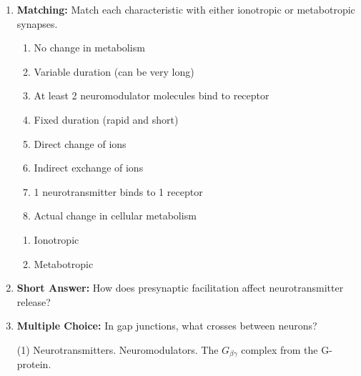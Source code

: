 \begin{enumerate}[label=\textbf{Q2.5.\arabic*}]
      \item \textbf{Matching:} Match each characteristic with either ionotropic or metabotropic synapses.
            \begin{wordbox}
                  \begin{enumerate}[label=(\alph*)]
                        \item No change in metabolism
                        \item Variable duration (can be very long)
                        \item At least 2 neuromodulator molecules bind to receptor
                        \item Fixed duration (rapid and short)
                        \item Direct change of ions
                        \item Indirect exchange of ions
                        \item 1 neurotransmitter binds to 1 receptor
                        \item Actual change in cellular metabolism
                  \end{enumerate}
            \end{wordbox}
            \begin{enumerate}[label=(\arabic*)]
                  \item Ionotropic \quad \dotfill \quad {} \\ 
                  \item Metabotropic \quad \dotfill \quad {}
            \end{enumerate}
                        
      \item \textbf{Short Answer:} How does presynaptic facilitation affect neurotransmitter release? \\
            
      \item \textbf{Multiple Choice:} In gap junctions, what crosses between neurons?
            \begin{tasks}[label=\textcolor{draculafg}{(\Alph*)}, item-format=\color{draculafg}, label-width=1.5em, item-indent=1.7em](1)
                  \task Neurotransmitters.
                  \task {}
                  \task Neuromodulators.
                  \task The \(G_{\beta\gamma}\) complex from the G-protein.
            \end{tasks}
            

\end{enumerate}
